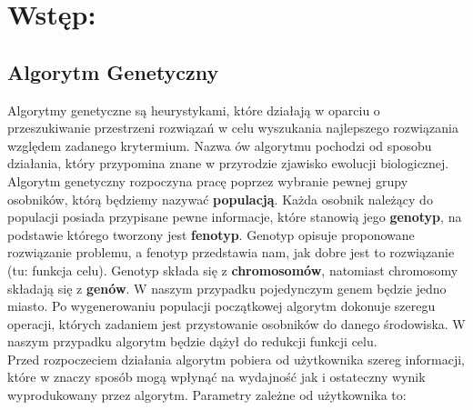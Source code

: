 \section{Wstęp: }
\subsection{Algorytm Genetyczny}
  Algorytmy genetyczne są heurystykami, które działają w oparciu o przeszukiwanie
  przestrzeni rozwiązań w celu wyszukania najlepszego rozwiązania względem
  zadanego krytermium. Nazwa ów algorytmu pochodzi od sposobu działania, który
  przypomina znane w przyrodzie zjawisko ewolucji biologicznej. \\
  Algorytm genetyczny rozpoczyna pracę poprzez wybranie pewnej grupy osobników,
  którą będziemy nazywać \textbf{populacją}. Każda osobnik należący do populacji
  posiada przypisane pewne informacje, które stanowią jego \textbf{genotyp}, na podstawie
  którego tworzony jest \textbf{fenotyp}. Genotyp opisuje proponowane rozwiązanie problemu, a fenotyp przedstawia nam, jak dobre jest to rozwiązanie 
  (tu: funkcja celu). Genotyp składa się z \textbf{chromosomów}, natomiast chromosomy składają
  się z \textbf{genów}. W naszym przypadku pojedynczym genem będzie jedno miasto. 
  Po wygenerowaniu populacji początkowej algorytm dokonuje szeregu operacji, których zadaniem
  jest przystowanie osobników do danego środowiska. W naszym przypadku algorytm
  będzie dążył do redukcji funkcji celu. \\
  Przed rozpoczeciem działania algorytm pobiera od użytkownika szereg informacji,
  które w znaczy sposób mogą wpłynąć na wydajność jak i ostateczny wynik
  wyprodukowany przez algorytm. Parametry zależne od użytkownika to:
